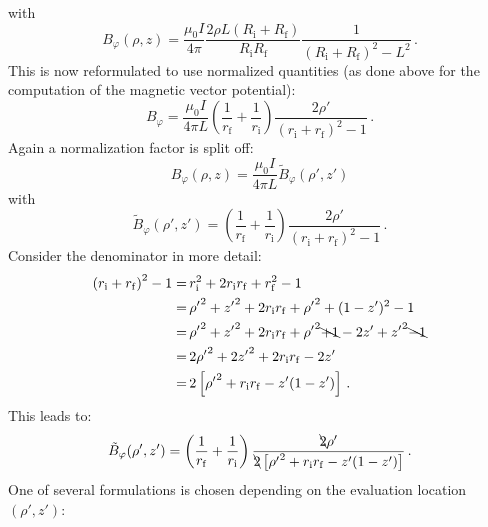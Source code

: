 with
\begin{equation}
 B_\varphi (\rho, z)
 = \frac{\mu_0 I}{4 \pi}
   \frac{2 \rho L (R_\mathrm{i} + R_\mathrm{f})}{R_\mathrm{i} R_\mathrm{f}}
   \frac{1}{\left(R_\mathrm{i} + R_\mathrm{f}\right)^2 - L^2} \, .
\end{equation}
This is now reformulated to use normalized quantities
(as done above for the computation of the magnetic vector potential):
\begin{equation}
 B_\varphi
 = \frac{\mu_0 I}{4 \pi L}
   \left(\frac{1}{r_\mathrm{f}} + \frac{1}{r_\mathrm{i}} \right)
   \frac{2 \rho'}{\left( r_\mathrm{i} + r_\mathrm{f} \right)^2 - 1} \, .
\end{equation}
Again a normalization factor is split off:
\begin{equation}
  B_\varphi(\rho, z) = \frac{\mu_0 I}{4 \pi L} \tilde{B}_\varphi(\rho', z')
\end{equation}
with
\begin{equation}
  \tilde{B}_\varphi(\rho', z')
  = \left(\frac{1}{r_\mathrm{f}} + \frac{1}{r_\mathrm{i}} \right)
    \frac{2 \rho'}{\left( r_\mathrm{i} + r_\mathrm{f} \right)^2 - 1} \, .
\end{equation}
Consider the denominator in more detail:
\begin{align}
 \left(r_\mathrm{i} + r_\mathrm{f}\right)^2 - 1
 =&\, r_\mathrm{i}^2 + 2 r_\mathrm{i} r_\mathrm{f} + r_\mathrm{f}^2 - 1 \nonumber \\
 =&\, {\rho'}^2 + {z'}^2 + 2 r_\mathrm{i} r_\mathrm{f} + {\rho'}^2 + (1 - z')^2 - 1 \nonumber \\
 =&\, {\rho'}^2 + {z'}^2 + 2 r_\mathrm{i} r_\mathrm{f} + {\rho'}^2 \bcancel{+ 1} - 2 z' + {z'}^2 \bcancel{- 1} \nonumber \\
 =&\, 2 {\rho'}^2 + 2 {z'}^2 + 2 r_\mathrm{i} r_\mathrm{f} - 2 z' \nonumber \\
 =&\, 2 \left[ {\rho'}^2 + r_\mathrm{i} r_\mathrm{f} - z' (1 - z') \right] \, .
\end{align}
This leads to:
\begin{equation}
 \tilde{B}_\varphi(\rho', z')
  = \left(\frac{1}{r_\mathrm{f}} + \frac{1}{r_\mathrm{i}} \right)
    \frac{\bcancel{2} \rho'}{\bcancel{2} \left[ {\rho'}^2 + r_\mathrm{i} r_\mathrm{f} - z' (1 - z') \right]} \, . \label{eqn:bPhiTilde}
\end{equation}
One of several formulations is chosen depending on the evaluation location~$(\rho', z')$:

